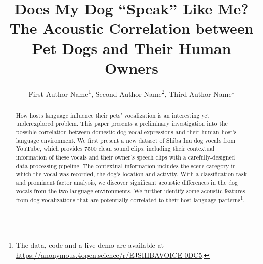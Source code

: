 \documentclass[letterpaper]{article}
\title{Does My Dog ``Speak'' Like Me? 
The Acoustic Correlation between Pet Dogs and Their Human Owners}
\author {
    First Author Name\textsuperscript{\rm 1},
    Second Author Name\textsuperscript{\rm 2},
    Third Author Name\textsuperscript{\rm 1}
}
\newcommand{\KZ}[1]{\textcolor{blue}{(Kenny: #1)}}
\begin{document}
\maketitle

\begin{abstract}
How hosts language influence their pets' vocalization is an interesting yet underexplored problem.
This paper presents a preliminary investigation into the possible correlation 
between domestic dog vocal expressions and their human host's
language environment.
We first present a new dataset of Shiba Inu dog vocals from YouTube, which 
provides 7500 clean sound clips, including their contextual information
of these vocals and their owner's speech clips with a carefully-designed data processing
pipeline. The contextual information includes the scene category 
in which the vocal was recorded, the dog's location and activity. 
With a classification task and prominent factor analysis, 
we discover significant acoustic differences in the dog vocals from the 
two language environments. We further identify some acoustic features from 
dog vocalizations that are potentially correlated to their host language patterns\footnote{The data, code
	and a live demo are available at 
	\url{https://anonymous.4open.science/r/EJSHIBAVOICE-0DC5}.}.
\end{abstract}






\end{document}
